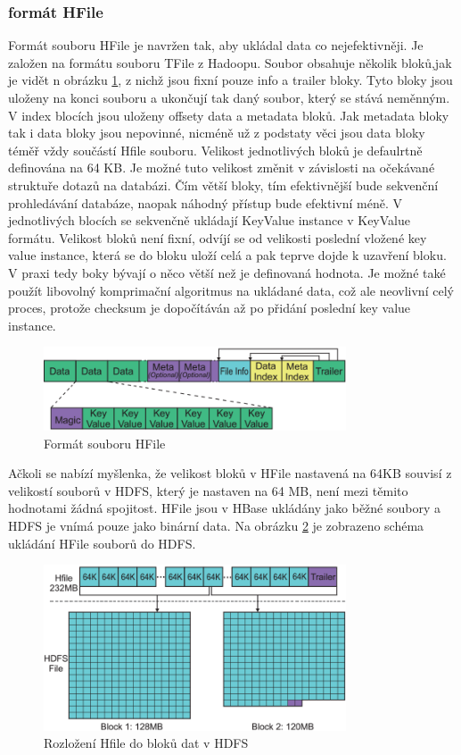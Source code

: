 \documentclass[thesis=M,czech]{FITthesis}[2012/06/26]
\begin{document}
\subsubsection{formát HFile}
Formát souboru HFile je navržen tak, aby ukládal data co nejefektivněji. Je založen na formátu souboru TFile z Hadoopu. Soubor obsahuje několik bloků,jak je vidět n obrázku \ref{fig:hfile}, z nichž jsou fixní pouze info a trailer bloky. Tyto bloky jsou uloženy na konci souboru a ukončují tak daný soubor, který se stává neměnným. V index blocích jsou uloženy offsety data a metadata bloků. Jak metadata bloky tak i data bloky jsou nepovinné, nicméně už z podstaty věci jsou data bloky téměř vždy součástí Hfile souboru. Velikost jednotlivých bloků je defaulrtně definována na 64 KB. Je možné tuto velikost změnit v závislosti na očekávané struktuře dotazů na databázi. Čím větší bloky, tím efektivnější bude sekvenční prohledávání databáze, naopak náhodný přístup bude efektivní méně. V jednotlivých blocích se sekvenčně ukládají KeyValue instance v KeyValue formátu. Velikost bloků není fixní, odvíjí se od velikosti poslední vložené key value instance, která se do bloku uloží celá a pak teprve dojde k uzavření bloku. V praxi tedy boky bývají o něco větší než je definovaná hodnota. Je možné také použít libovolný komprimační algoritmus na ukládané data, což ale neovlivní celý proces, protože checksum je dopočítáván až po přidání poslední key value instance.
\begin{figure}\centering
	\includegraphics[width=0.8\textwidth, angle=0]{files/HFile}
	\caption[Formát souboru HFile]{Formát souboru HFile}\label{fig:hfile}
\end{figure}


Ačkoli se nabízí myšlenka, že velikost bloků v HFile nastavená na 64KB souvisí z velikostí souborů v HDFS, který je nastaven na 64 MB, není mezi těmito hodnotami žádná spojitost. HFile jsou v HBase ukládány jako běžné soubory a HDFS je vnímá pouze jako binární data. Na obrázku \ref{fig:hfiletohdfs} je zobrazeno schéma ukládání HFile souborů do HDFS.


\begin{figure}\centering
	\includegraphics[width=0.8\textwidth, angle=0]{files/HFileToHDFS}
	\caption[Rozložení Hfile do bloků dat v HDFS]{Rozložení Hfile do bloků dat v HDFS}\label{fig:hfiletohdfs}
\end{figure}
\end{document}

